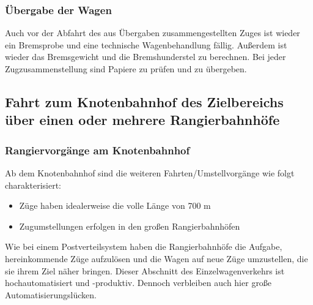 \subsubsection{Übergabe der Wagen}\label{sec:UEdWagen}
Auch vor der Abfahrt des aus Übergaben zusammengestellten Zuges ist wieder ein \gls{Bremsprobe} und eine technische Wagenbehandlung fällig. Außerdem ist wieder das Bremsgewicht und die Bremshunderstel zu berechnen. Bei jeder Zugzusammenstellung sind Papiere zu prüfen und zu übergeben.

\subsection{Fahrt zum Knotenbahnhof des Zielbereichs über einen oder mehrere Rangierbahnhöfe}
\subsubsection{Rangiervorgänge am Knotenbahnhof}\label{sec:RangKnoten}
Ab dem \gls{Knotenbahnhof} sind die weiteren Fahrten/Umstellvorgänge wie folgt charakterisiert:
\begin{itemize}
    \item Züge haben idealerweise die volle Länge von 700 m
    \item Zugumstellungen erfolgen in den großen Rangierbahnhöfen
\end{itemize}
Wie bei einem Postverteilsystem haben die Rangierbahnhöfe die Aufgabe, hereinkommende Züge aufzulösen und die Wagen auf neue Züge umzustellen, die sie ihrem Ziel näher bringen. Dieser Abschnitt des Einzelwagenverkehrs ist hochautomatisiert und -produktiv. Dennoch verbleiben auch hier große Automatisierungslücken. 
